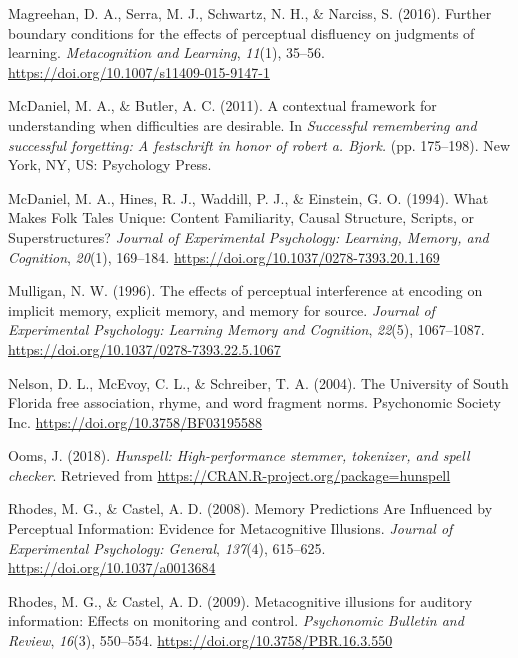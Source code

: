 \documentclass[english,pdf]{apa6}
\begin{document}
\leavevmode\hypertarget{ref-Magreehan2016}{}%
Magreehan, D. A., Serra, M. J., Schwartz, N. H., \& Narciss, S. (2016). Further boundary conditions for the effects of perceptual disfluency on judgments of learning. \emph{Metacognition and Learning}, \emph{11}(1), 35--56. \url{https://doi.org/10.1007/s11409-015-9147-1}

\leavevmode\hypertarget{ref-McDaniel2011}{}%
McDaniel, M. A., \& Butler, A. C. (2011). A contextual framework for understanding when difficulties are desirable. In \emph{Successful remembering and successful forgetting: A festschrift in honor of robert a. Bjork.} (pp. 175--198). New York, NY, US: Psychology Press.

\leavevmode\hypertarget{ref-McDaniel1994}{}%
McDaniel, M. A., Hines, R. J., Waddill, P. J., \& Einstein, G. O. (1994). What Makes Folk Tales Unique: Content Familiarity, Causal Structure, Scripts, or Superstructures? \emph{Journal of Experimental Psychology: Learning, Memory, and Cognition}, \emph{20}(1), 169--184. \url{https://doi.org/10.1037/0278-7393.20.1.169}

\leavevmode\hypertarget{ref-Mulligan1996}{}%
Mulligan, N. W. (1996). The effects of perceptual interference at encoding on implicit memory, explicit memory, and memory for source. \emph{Journal of Experimental Psychology: Learning Memory and Cognition}, \emph{22}(5), 1067--1087. \url{https://doi.org/10.1037/0278-7393.22.5.1067}

\leavevmode\hypertarget{ref-Nelson2004}{}%
Nelson, D. L., McEvoy, C. L., \& Schreiber, T. A. (2004). The University of South Florida free association, rhyme, and word fragment norms. Psychonomic Society Inc. \url{https://doi.org/10.3758/BF03195588}

\leavevmode\hypertarget{ref-Ooms2018}{}%
Ooms, J. (2018). \emph{Hunspell: High-performance stemmer, tokenizer, and spell checker}. Retrieved from \url{https://CRAN.R-project.org/package=hunspell}

\leavevmode\hypertarget{ref-Rhodes2008}{}%
Rhodes, M. G., \& Castel, A. D. (2008). Memory Predictions Are Influenced by Perceptual Information: Evidence for Metacognitive Illusions. \emph{Journal of Experimental Psychology: General}, \emph{137}(4), 615--625. \url{https://doi.org/10.1037/a0013684}

\leavevmode\hypertarget{ref-Rhodes2009}{}%
Rhodes, M. G., \& Castel, A. D. (2009). Metacognitive illusions for auditory information: Effects on monitoring and control. \emph{Psychonomic Bulletin and Review}, \emph{16}(3), 550--554. \url{https://doi.org/10.3758/PBR.16.3.550}
\end{document}
